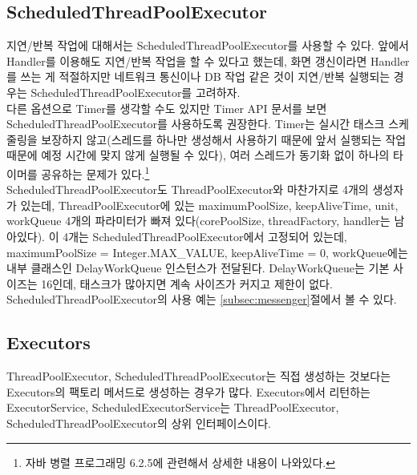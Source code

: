 \subsection{ScheduledThreadPoolExecutor}
지연/반복 작업에 대해서는 ScheduledThreadPoolExecutor를 사용할 수 있다.
앞에서 Handler를 이용해도 지연/반복 작업을 할 수 있다고 했는데, 화면 갱신이라면 Handler를 쓰는 게 적절하지만 네트워크 통신이나 DB 작업 같은 것이 지연/반복 실행되는 경우는 ScheduledThreadPoolExecutor를 고려하자.\\

다른 옵션으로 Timer를 생각할 수도 있지만 Timer API 문서를 보면 ScheduledThreadPoolExecutor를 사용하도록 권장한다. Timer는 실시간 태스크 스케줄링을 보장하지 않고(스레드를 하나만 생성해서 사용하기 때문에 앞서 실행되는 작업 때문에 예정 시간에 맞지 않게 실행될 수 있다), 여러 스레드가 동기화 없이 하나의 타이머를 공유하는 문제가 있다.\footnote{자바 병렬 프로그래밍 6.2.5에 관련해서 상세한 내용이 나와있다.}\\

ScheduledThreadPoolExecutor도 ThreadPoolExecutor와 마찬가지로 4개의 생성자가 있는데, ThreadPoolExecutor에 있는 maximumPoolSize, keepAliveTime, unit, workQueue 4개의 파라미터가 빠져 있다(corePoolSize, threadFactory, handler는 남아있다).
이 4개는 ScheduledThreadPoolExecutor에서 고정되어 있는데,
maximumPoolSize = Integer.MAX\_VALUE, keepAliveTime = 0, workQueue에는 내부 클래스인 DelayWorkQueue 인스턴스가 전달된다.
DelayWorkQueue는 기본 사이즈는 16인데, 태스크가 많아지면 계속 사이즈가 커지고 제한이 없다.\\

ScheduledThreadPoolExecutor의 사용 예는 \ref{subsec:messenger}절에서 볼 수 있다.

\subsection{Executors}
ThreadPoolExecutor, ScheduledThreadPoolExecutor는 직접 생성하는 것보다는 Executors의 팩토리 메서드로 생성하는 경우가 많다.
Executors에서 리턴하는 ExecutorService, ScheduledExecutorService는 ThreadPoolExecutor, ScheduledThreadPoolExecutor의 상위 인터페이스이다.\\

